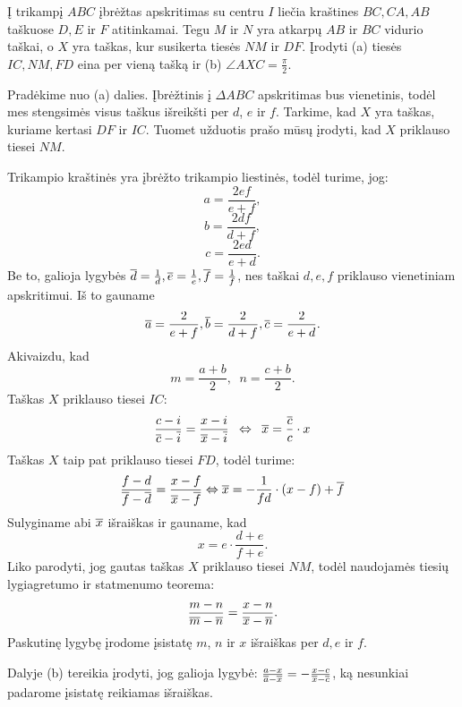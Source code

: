 \documentclass[11pt,a4paper,twoside]{book}
\begin{document}
\begin{pavnr}
Į trikampį $ABC$ įbrėžtas apskritimas su centru $I$ liečia kraštines $BC, CA, AB$ taškuose $D, E$ ir $F$ atitinkamai. Tegu $M$ ir $N$ yra atkarpų $AB$ ir $BC$ vidurio taškai, o $X$ yra taškas, kur susikerta tiesės $NM$ ir $DF$. Įrodyti (a) tiesės $IC, NM, FD$ eina per vieną tašką ir (b) $\angle AXC = \frac{\pi}{2}$. 
\end{pavnr}

\begin{sprendimas}
Pradėkime nuo (a) dalies. Įbrėžtinis į $\Delta ABC$ apskritimas bus vienetinis, todėl mes stengsimės visus taškus išreikšti per $d$, $e$ ir $f$. Tarkime, kad $X$ yra taškas, kuriame kertasi $DF$ ir $IC$. Tuomet užduotis prašo mūsų įrodyti, kad $X$ priklauso tiesei $NM$. 

Trikampio kraštinės yra įbrėžto trikampio liestinės, todėl turime, jog:
$$ a =\frac{2ef}{e+f},$$
$$ b=\frac{2df}{d+f},$$
$$ c=\frac{2ed}{e+d}.$$
Be to, galioja lygybės $\overline{d}= \frac{1}{d}, \overline{e}= \frac{1}{e}, \overline{f}= \frac{1}{f}$, nes taškai $d, e, f$ priklauso vienetiniam apskritimui. Iš to gauname
$$ \overline a =\frac{2}{e+f}, \overline b=\frac{2}{d+f}, \overline c=\frac{2}{e+d}.$$
Akivaizdu, kad
$$ m=\frac{a+b}{2}, \phantom{a} n=\frac{c+b}{2}.$$
Taškas $X$ priklauso tiesei $IC$:
$$ \frac{c-i}{\overline{c}-\overline{i}}=\frac{x-i}{\overline{x} - \overline{i}} {\phantom{a}}\Leftrightarrow \phantom{a} \overline{x}= \frac{\overline{c}}{c}\cdot  x $$ 
Taškas $X$ taip pat priklauso tiesei $FD$, todėl turime:
$$\frac{f-d}{\overline{f}-\overline{d}}=\frac{x-f}{\overline{x} - \overline{f}} \Leftrightarrow \overline{x}= -\frac{1}{fd}\cdot  (x-f)+\overline{f} $$
Sulyginame abi $\overline{x}$ išraiškas ir gauname, kad 
$$ x = e \cdot \frac{d+e}{f+e}.$$
Liko parodyti, jog gautas taškas $X$ priklauso tiesei $NM$, todėl naudojamės tiesių lygiagretumo ir statmenumo teorema:
$$ \frac{m-n}{\overline{m}-\overline{n}}=\frac{x-n}{\overline{x} - \overline{n}}.$$
Paskutinę lygybę įrodome įsistatę $m$, $n$ ir $x$ išraiškas per $d, e$ ir $f$.

Dalyje (b) tereikia įrodyti, jog galioja lygybė: $\frac{a-x}{\overline{a}-\overline{x}}= - \frac{x-c}{\overline{x} - \overline{c}}$, ką nesunkiai padarome įsistatę reikiamas išraiškas.
\end{sprendimas}
\end{document}

